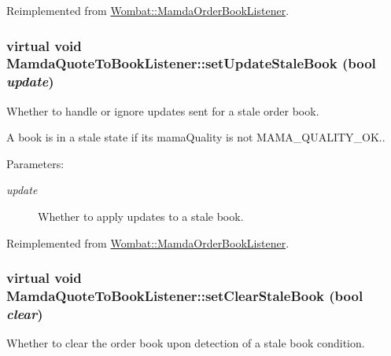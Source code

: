 Reimplemented from \hyperlink{classWombat_1_1MamdaOrderBookListener_8d9563f0639d57630d786a614da5ad60}{Wombat::Mamda\-Order\-Book\-Listener}.\hypertarget{classMamdaQuoteToBookListener_008e8954749115fa7cedc257e61480c3}{
\subsubsection[setUpdateStaleBook]{\setlength{\rightskip}{0pt plus 5cm}virtual void Mamda\-Quote\-To\-Book\-Listener::set\-Update\-Stale\-Book (bool {\em update})}}
\label{classMamdaQuoteToBookListener_008e8954749115fa7cedc257e61480c3}


Whether to handle or ignore updates sent for a stale order book. 

A book is in a stale state if its mama\-Quality is not MAMA\_\-QUALITY\_\-OK..

\begin{Desc}
\item[Parameters:]
\begin{description}
\item[{\em update}]Whether to apply updates to a stale book. \end{description}
\end{Desc}


Reimplemented from \hyperlink{classWombat_1_1MamdaOrderBookListener_a32964aa10c3d4f2021f55018585d4a7}{Wombat::Mamda\-Order\-Book\-Listener}.\hypertarget{classMamdaQuoteToBookListener_f82df90339d23957d41fc15831b6753f}{
\subsubsection[setClearStaleBook]{\setlength{\rightskip}{0pt plus 5cm}virtual void Mamda\-Quote\-To\-Book\-Listener::set\-Clear\-Stale\-Book (bool {\em clear})}}
\label{classMamdaQuoteToBookListener_f82df90339d23957d41fc15831b6753f}


Whether to clear the order book upon detection of a stale book condition. 

